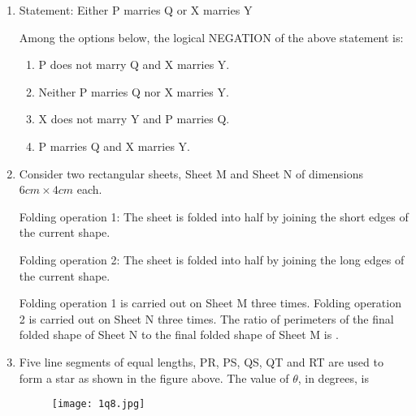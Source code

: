 \documentclass[journal,12pt,onecolumn]{article}
\theoremstyle{remark}
\begin{document}
\begin{enumerate}
\item Statement: Either P marries Q or X marries Y

Among the options below, the logical NEGATION of the above statement is:

\hfill{}
\begin{enumerate}
    \item P does not marry Q and X marries Y.
    \item Neither P marries Q nor X marries Y.
    \item X does not marry Y and P marries Q.
    \item P marries Q and X marries Y.
\end{enumerate}

\item Consider two rectangular sheets, Sheet M and Sheet N of dimensions $6cm \times 4cm$ each.

Folding operation 1: The sheet is folded into half by joining the short edges of the current shape.

Folding operation 2: The sheet is folded into half by joining the long edges of the current shape.

Folding operation 1 is carried out on Sheet M three times.
Folding operation 2 is carried out on Sheet N three times.
The ratio of perimeters of the final folded shape of Sheet N to the final folded shape of Sheet M is \underline{\hspace{2cm}}.

\hfill{}
\begin{enumerate}
\end{enumerate}


\item Five line segments of equal lengths, PR, PS, QS, QT and RT are used to form a star as shown in the figure above.
The value of $\theta$, in degrees, is \underline{\hspace{2cm}}
\begin{figure}[H]
    \centering
    \texttt{[image: 1q8.jpg]}
    \caption{}
    \label{fig:q8}
\end{figure}
\hfill{}
\begin{enumerate}
\end{enumerate}


\end{enumerate}
\end{document}
